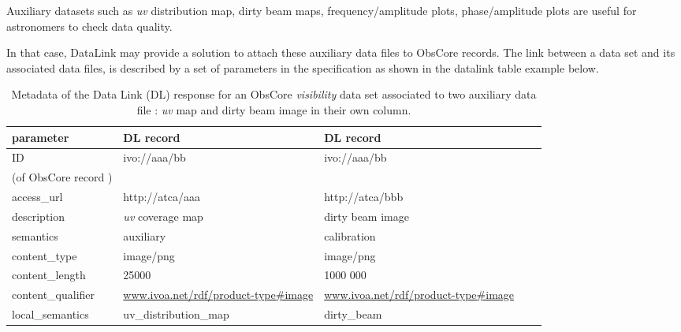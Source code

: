 \documentclass[11pt,a4paper]{ivoa}
\begin{document}
Auxiliary datasets such as  \emph{uv} distribution map, dirty beam maps, frequency/amplitude plots, phase/amplitude plots are useful for astronomers to check data quality.

In that case,  DataLink \citep{2023ivoa.spec.1215B} may provide a solution to attach these auxiliary data files to ObsCore records. The link between a data set and its associated data files, is described by a set of parameters in  the specification as  shown in the datalink table example below.
\begin{table}[h]
\begin{flushleft}
\begin{tabular}{| l l l l l | |}
\hline
{\bf parameter} & {\bf DL record  } & {\bf DL record}  \\
\hline
ID   & ivo://aaa/bb & ivo://aaa/bb  \\
(of ObsCore record )  &  &   \\
\hline
access\_url     &http://atca/aaa & http://atca/bbb\\
\hline
description     & \emph{uv} coverage map   & dirty beam image  \\
\hline
semantics       & auxiliary&  calibration\\
\hline
content\_type   & image/png& image/png \\
\hline
content\_length & 25000 & 1000 000\\
\hline
content\_qualifier & \footnotesize{\url{www.ivoa.net/rdf/product-type#image}} &  \footnotesize{\url{www.ivoa.net/rdf/product-type#image}}\\
\hline
local\_semantics &   uv\_distribution\_map& dirty\_beam  \\
\hline
\end{tabular}
\end{flushleft}
\caption{Metadata of the Data Link (DL) response for an ObsCore  \emph{visibility} data set  associated to two auxiliary data file :  \emph{uv} map and dirty beam image in their own column. }
\label{fig:linkFields}
\end{table}




\end{document}
